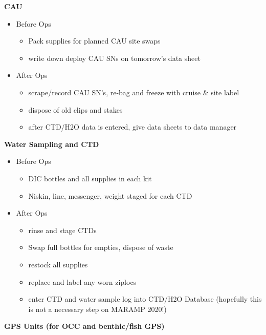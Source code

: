 \documentclass[
]{book}
\providecommand{\tightlist}{%
  \setlength{\itemsep}{0pt}\setlength{\parskip}{0pt}}
\begin{document}
\textbf{CAU}

\begin{itemize}
\tightlist
\item
  Before Ops

  \begin{itemize}
  \tightlist
  \item
    Pack supplies for planned CAU site swaps
  \item
    write down deploy CAU SNs on tomorrow's data sheet
  \end{itemize}
\item
  After Ops

  \begin{itemize}
  \tightlist
  \item
    scrape/record CAU SN's, re-bag and freeze with cruise \& site label
  \item
    dispose of old clips and stakes
  \item
    after CTD/H2O data is entered, give data sheets to data manager
  \end{itemize}
\end{itemize}

\textbf{Water Sampling and CTD}

\begin{itemize}
\tightlist
\item
  Before Ops

  \begin{itemize}
  \tightlist
  \item
    DIC bottles and all supplies in each kit
  \item
    Niskin, line, messenger, weight staged for each CTD
  \end{itemize}
\item
  After Ops

  \begin{itemize}
  \tightlist
  \item
    rinse and stage CTDs
  \item
    Swap full bottles for empties, dispose of waste
  \item
    restock all supplies
  \item
    replace and label any worn ziplocs
  \item
    enter CTD and water sample log into CTD/H2O Database (hopefully this is not a necessary step on MARAMP 2020!)
  \end{itemize}
\end{itemize}

\textbf{GPS Units (for OCC and benthic/fish GPS)}
\end{document}

